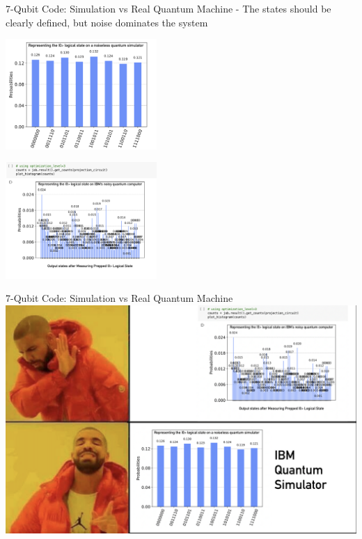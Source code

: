 \documentclass{beamer}
\begin{document}
\begin{frame}{7-Qubit Code: Simulation vs Real Quantum Machine}
    - The states should be clearly defined, but noise dominates the system
    \begin{center}
   	\begin{minipage}[b]{0.47\linewidth}
	    	\includegraphics[width=5.75cm]{simulator_stateprep_7qb}
	\end{minipage}
	\quad 
	\begin{minipage}[b]{0.47\linewidth}
		\includegraphics[width=5.75cm]{7-melbourne-fidelity}
	\end{minipage}
    \end{center}
\end{frame}

\begin{frame}{7-Qubit Code: Simulation vs Real Quantum Machine}
  \includegraphics[width=\textwidth]{7qb_drake}
\end{frame}
\end{document}
